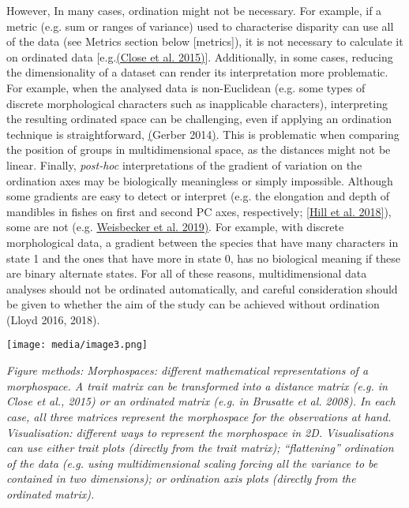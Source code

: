 However, In many cases, ordination might not be necessary. For example, if a metric (e.g. sum or ranges of variance) used to characterise disparity can use all of the data (see Metrics section below {[}metrics{]}), it is not necessary to calculate it on ordinated data {[}e.g.\href{https://paperpile.com/c/sTGYvp/PbSx}{(Close et al. 2015)}{]}.
Additionally, in some cases, reducing the dimensionality of a dataset can render its interpretation more problematic.
For example, when the analysed data is non-Euclidean (e.g. some types of discrete morphological characters such as inapplicable characters), interpreting the resulting ordinated space can be challenging, even if applying an ordination technique is straightforward, \href{https://paperpile.com/c/sTGYvp/SJbC}{(}Gerber 2014\href{https://paperpile.com/c/sTGYvp/SJbC}{)}. %
This is problematic when comparing the position of groups in multidimensional space, as the distances might not be linear.
Finally, \emph{post-hoc} interpretations of the gradient of variation on the ordination axes may be biologically meaningless or simply impossible. %
Although some gradients are easy to detect or interpret (e.g. the elongation and depth of mandibles in fishes on first and second PC axes, respectively; {[}\href{https://paperpile.com/c/sTGYvp/3JPy}{Hill et al. 2018{]}}), some are not (e.g. \href{https://paperpile.com/c/sTGYvp/TZzO}{Weisbecker et al. 2019)}.
For example, with discrete morphological data, a gradient between the species that have many characters in state 1 and the ones that have more in state 0, has no biological meaning if these are binary alternate states.
For all of these reasons, multidimensional data analyses should not be ordinated automatically, and careful consideration should be given to whether the aim of the study can be achieved without ordination (Lloyd 2016, 2018).

\texttt{[image: media/image3.png]}

\emph{Figure methods: Morphospaces: different mathematical
representations of a} \emph{morphospace. A trait matrix can be
transformed into a distance matrix (e.g. in Close et al., 2015) or an
ordinated matrix (e.g. in Brusatte et al.} \emph{2008). In each case,
all three matrices represent the morphospace for the observations at
hand. Visualisation: different ways to represent the morphospace in 2D.
Visualisations can use either trait plots (directly from the trait
matrix); ``flattening'' ordination of the data (e.g. using
multidimensional scaling} \emph{forcing all the variance to be contained
in two dimensions); or ordination axis plots (directly from the
ordinated matrix).}

